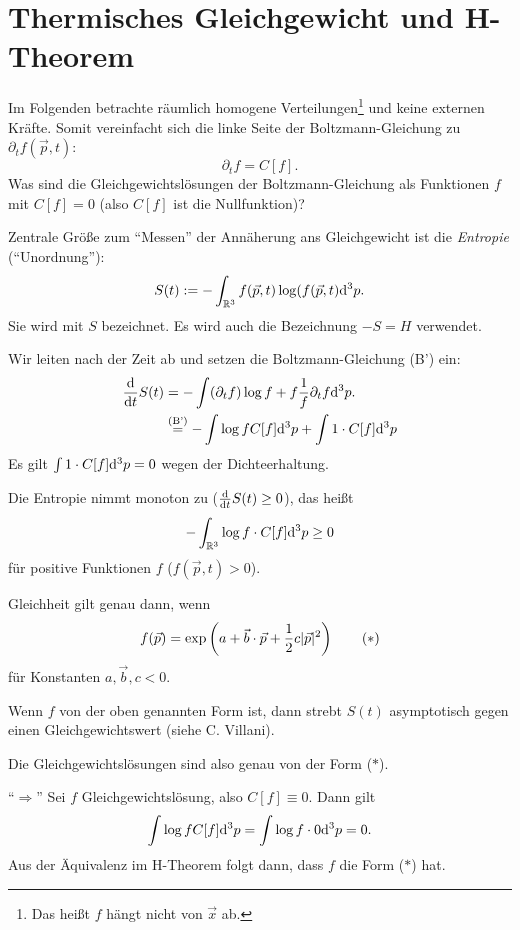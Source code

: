 \section{Thermisches Gleichgewicht und H-Theorem}
Im Folgenden betrachte räumlich homogene Verteilungen\footnote{%
  Das heißt $f$ hängt nicht von $\vec{x}$ ab.}
und keine externen Kräfte. Somit vereinfacht sich die linke Seite der
Boltzmann-Gleichung zu $\partial_t f( \vec{p}, t)$:
\[ \partial_t f = C[f]. \tag{B'} \]
Was sind die Gleichgewichtslösungen der Boltzmann-Gleichung als Funktionen $f$
mit $C[f] = 0$ (also $C[f]$ ist die Nullfunktion)?

Zentrale Größe zum ``Messen'' der Annäherung ans Gleichgewicht ist die
\emph{Entropie} (``Unordnung''):
\[ S(t) := - \int_{\mathbb{R}^3} f( \vec{p}, t ) \log( f( \vec{p}, t) \mathrm{d}^3 p. \]
Sie wird mit $S$ bezeichnet. Es wird auch die Bezeichnung $-S = H$ verwendet.

Wir leiten nach der Zeit ab und setzen die Boltzmann-Gleichung (B') ein:
\[ \begin{aligned}
    \frac{\mathrm{d} }{\mathrm{d} t} S(t) &= - \int (\partial_t f) \log f + f \frac{1}{f} \partial_t f
    \mathrm{d}^3 p. \\
    &\overset{(\text{B'})}{=}
    - \int \log f C[f] \mathrm{d}^3 p + \int 1 \cdot C[f] \mathrm{d}^3 p
  \end{aligned}
\]
Es gilt $\int 1 \cdot C[f] \mathrm{d}^3 p = 0$ wegen der Dichteerhaltung.

\begin{thm}
  Die Entropie nimmt monoton zu ($\frac{\mathrm{d} }{\mathrm{d} t} S(t) \ge 0$), das heißt
  \[ - \int_{\mathbb{R}^3} \log f \cdot C[f] \mathrm{d}^3 p \ge 0 \]
  für positive Funktionen $f$ ($f(\vec{p}, t) > 0$).

  Gleichheit gilt genau dann, wenn
  \[ f(\vec{p}) = \exp \left( a + \vec{b} \cdot \vec{p} + \frac{1}{2} c |\vec{p}|^2
      \right) \tag{$\ast$} \] 
  für Konstanten $a, \vec{b}, c < 0$.
\end{thm}

\begin{rmrk*}
  Wenn $f$ von der oben genannten Form ist, dann strebt $S(t)$ asymptotisch
  gegen einen Gleichgewichtswert (siehe C. Villani).
\end{rmrk*}

Die Gleichgewichtslösungen sind also genau von der Form ($\ast$).

``$\Rightarrow$'' Sei $f$ Gleichgewichtslösung, also $C[f] \equiv 0$. Dann gilt
\[ \int \log f C[f] \mathrm{d}^3 p = \int \log f \cdot 0 \mathrm{d}^3 p = 0. \]
Aus der Äquivalenz im H-Theorem folgt dann, dass $f$ die Form ($\ast$) hat.


